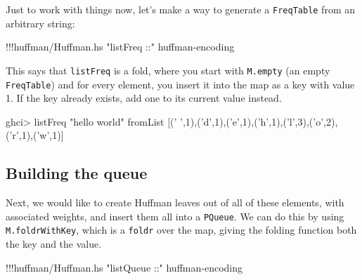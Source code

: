 \documentclass[]{article}
\newenvironment{Shaded}{}{}
\newcommand{\DecValTok}[1]{\textcolor[rgb]{0.25,0.63,0.44}{{#1}}}
\newcommand{\CharTok}[1]{\textcolor[rgb]{0.25,0.44,0.63}{{#1}}}
\newcommand{\StringTok}[1]{\textcolor[rgb]{0.25,0.44,0.63}{{#1}}}
\newcommand{\FunctionTok}[1]{\textcolor[rgb]{0.02,0.16,0.49}{{#1}}}
\newcommand{\NormalTok}[1]{{#1}}
\begin{document}
Just to work with things now, let's make a way to generate a
\texttt{FreqTable} from an arbitrary string:

\begin{Shaded}
\begin{Highlighting}[]
\FunctionTok{!!!}\NormalTok{huffman}\FunctionTok{/}\NormalTok{Huffman.hs }\StringTok{"listFreq ::"} \NormalTok{huffman}\FunctionTok{-}\NormalTok{encoding}
\end{Highlighting}
\end{Shaded}

This says that \texttt{listFreq} is a fold, where you start with
\texttt{M.empty} (an empty \texttt{FreqTable}) and for every element,
you insert it into the map as a key with value 1. If the key already
exists, add one to its current value instead.

\begin{Shaded}
\begin{Highlighting}[]
\NormalTok{ghci}\FunctionTok{>} \NormalTok{listFreq }\StringTok{"hello world"}
\NormalTok{fromList [(}\CharTok{' '}\NormalTok{,}\DecValTok{1}\NormalTok{),(}\CharTok{'d'}\NormalTok{,}\DecValTok{1}\NormalTok{),(}\CharTok{'e'}\NormalTok{,}\DecValTok{1}\NormalTok{),(}\CharTok{'h'}\NormalTok{,}\DecValTok{1}\NormalTok{),(}\CharTok{'l'}\NormalTok{,}\DecValTok{3}\NormalTok{),(}\CharTok{'o'}\NormalTok{,}\DecValTok{2}\NormalTok{),(}\CharTok{'r'}\NormalTok{,}\DecValTok{1}\NormalTok{),(}\CharTok{'w'}\NormalTok{,}\DecValTok{1}\NormalTok{)]}
\end{Highlighting}
\end{Shaded}

\subsection{Building the queue}\label{building-the-queue}

Next, we would like to create Huffman leaves out of all of these
elements, with associated weights, and insert them all into a
\texttt{PQueue}. We can do this by using \texttt{M.foldrWithKey}, which
is a \texttt{foldr} over the map, giving the folding function both the
key and the value.

\begin{Shaded}
\begin{Highlighting}[]
\FunctionTok{!!!}\NormalTok{huffman}\FunctionTok{/}\NormalTok{Huffman.hs }\StringTok{"listQueue ::"} \NormalTok{huffman}\FunctionTok{-}\NormalTok{encoding}
\end{Highlighting}
\end{Shaded}
\end{document}
